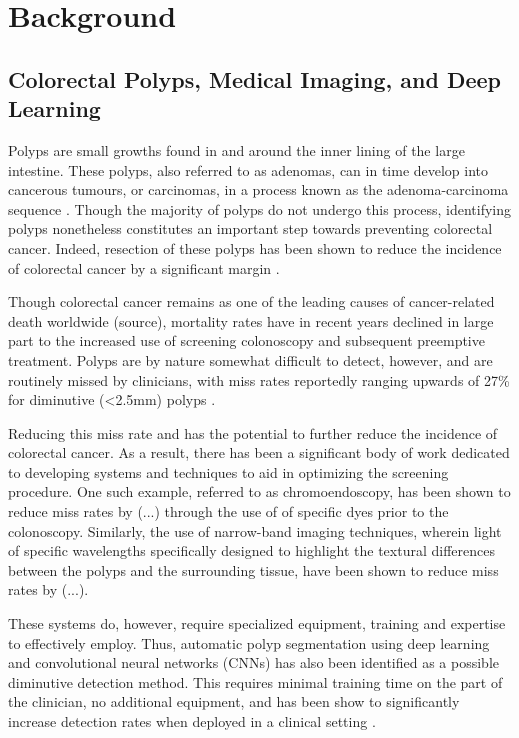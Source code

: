 \chapter{Background} \label{background}

\section{Colorectal Polyps, Medical Imaging, and Deep Learning}
	Polyps are small growths found in and around the inner lining of the large intestine. These polyps, also referred to as adenomas, can in time develop into cancerous tumours, or carcinomas, in a process known as the adenoma-carcinoma sequence \cite{ACS}. Though the majority of polyps do not undergo this process, identifying polyps nonetheless constitutes an important step towards preventing colorectal cancer. Indeed, resection of these polyps has been shown to reduce the incidence of colorectal cancer by a significant margin \cite{resection}. 
	
	Though colorectal cancer remains as one of the leading causes of cancer-related death worldwide (source), mortality rates have in recent years declined in large part to the increased use of screening colonoscopy and subsequent preemptive treatment. Polyps are by nature somewhat difficult to detect, however, and are routinely missed by clinicians, with miss rates reportedly ranging upwards of 27\% for diminutive (<2.5mm) polyps \cite{missrate1, missrate2}.
	
	Reducing this miss rate and has the potential to further reduce the incidence of colorectal cancer. As a result, there has been a significant body of work dedicated to developing systems and techniques to aid in optimizing the screening procedure. One such example, referred to as chromoendoscopy, has been shown to reduce miss rates by (...) through the use of of specific dyes prior to the colonoscopy. Similarly, the use of narrow-band imaging techniques, wherein light of specific wavelengths specifically designed to highlight the textural differences between the polyps and the surrounding tissue, have been shown to reduce miss rates by (...). 
	
	These systems do, however, require specialized equipment, training and expertise to effectively employ. Thus, automatic polyp segmentation using deep learning and convolutional neural networks (CNNs) has also been identified as a possible diminutive detection method. This requires minimal training time on the part of the clinician, no additional equipment, and has been show to significantly increase detection rates when deployed in a clinical setting \cite{polyp-success-story}. 

